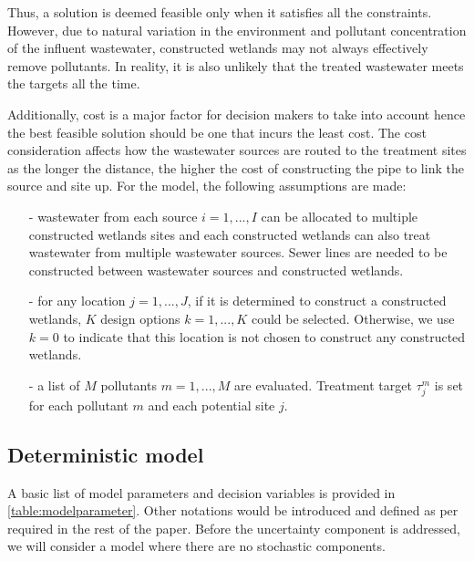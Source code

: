 \documentclass[preprint,12pt,authoryear]{elsarticle}
\begin{document}
Thus, a solution is deemed feasible only when it satisfies all the constraints. However, due to natural variation in the environment and pollutant concentration of the influent wastewater, constructed wetlands may not always effectively remove pollutants. In reality, it is also unlikely that the treated wastewater meets the targets all the time. 

Additionally, cost is a major factor for decision makers to take into account hence the best feasible solution should be one that incurs the least cost. The cost consideration affects how the wastewater sources are routed to the treatment sites as the longer the distance, the higher the cost of constructing the pipe to link the source and site up. For the model, the following assumptions are made:

\begin{itemize}
	\setlength{\itemsep}{0pt}
	\setlength{\parskip}{0pt}
	\setlength{\parsep}{0pt}
	\item[-] wastewater from each source $i=1,...,I$ can be allocated to multiple constructed wetlands sites and each constructed wetlands can also treat wastewater from multiple wastewater sources. Sewer lines are needed to be constructed between wastewater sources and constructed wetlands. 
	\item[-] for any location $j=1,...,J$, if it is determined to construct a constructed wetlands, $K$ design options $k=1,...,K$ could be selected. Otherwise, we use $k=0$ to indicate that this location is not chosen to construct any constructed wetlands. 
	\item[-] a list of $M$ pollutants $m=1,...,M$ are evaluated. Treatment target $\tau_j^m$ is set for each pollutant $m$ and each potential site $j$.
\end{itemize}

\subsection{Deterministic model}\label{detmodel}

A basic list of model parameters and decision variables is provided in \autoref{table:modelparameter}. Other notations would be introduced and defined as per required in the rest of the paper. Before the uncertainty component is addressed, we will consider a model where there are no stochastic components.
\end{document}

